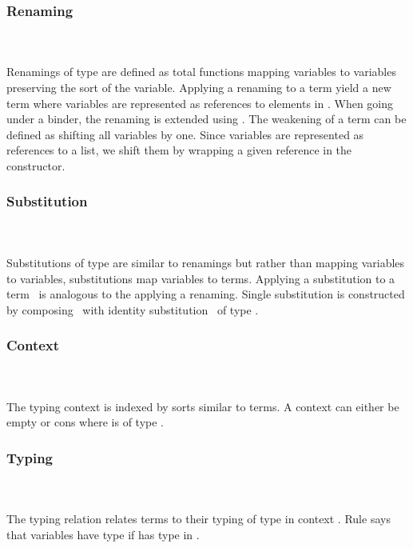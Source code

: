 \subsubsection{Renaming}\hfill\\\\
Renamings  of type    are defined as total functions mapping variables    to variables    preserving the sort  of the variable.
\FRen
Applying a renaming    to a term    yield a new term    where variables are represented as references    to elements in .
\Fren
When going under a binder, the renaming is extended using \Frenext. 
The weakening of a term can be defined as shifting all variables by one.
\Fwk 
Since variables are represented as references to a list, we shift them by wrapping a given reference in the  constructor.

\subsubsection{Substitution}\hfill\\\\
Substitutions  of type    are similar to renamings but rather than mapping variables to variables, substitutions map variables to terms.
\FSub
Applying a substitution to a term \Fsub\ is analogous to the applying a renaming. 
Single substitution is constructed by composing \Fsinglesub\ with identity substitution \Fidsub\ of type  .
\Fsubs

\subsubsection{Context}\hfill\\\\
The typing context   is indexed by sorts  similar to terms. 
\FCtx
A context can either be empty  or cons    where  is of type   . 

\subsubsection{Typing}\hfill\\\\
The typing relation    \Data{:}  relates terms  to their typing of type    in context .
\FTyping
Rule  says that variables   have type  if  has type  in .

